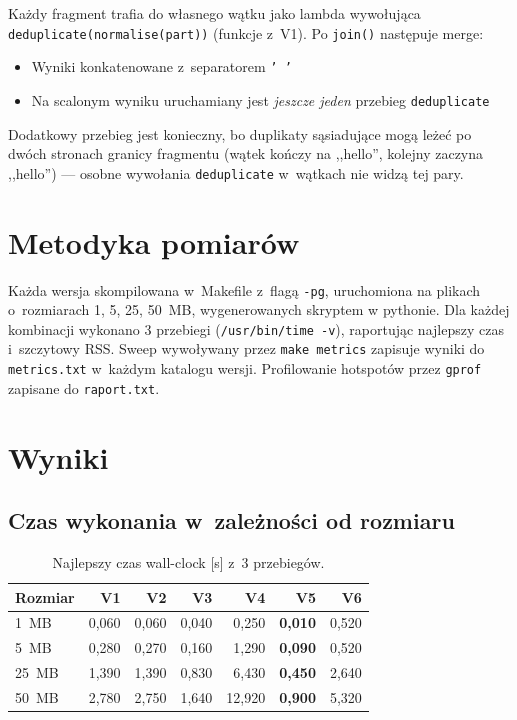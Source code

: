 \documentclass[11pt,a4paper]{article}
\begin{document}
Każdy fragment trafia do własnego wątku jako lambda wywołująca \texttt{deduplicate(normalise(part))} (funkcje z~V1). Po \texttt{join()} następuje merge:
\begin{itemize}
    \item Wyniki konkatenowane z~separatorem \texttt{' '}
    \item Na scalonym wyniku uruchamiany jest \emph{jeszcze jeden} przebieg \texttt{deduplicate}
\end{itemize}
Dodatkowy przebieg jest konieczny, bo duplikaty sąsiadujące mogą leżeć po dwóch stronach granicy fragmentu (wątek kończy na ,,hello'', kolejny zaczyna ,,hello'') --- osobne wywołania \texttt{deduplicate} w~wątkach nie widzą tej pary.

\section{Metodyka pomiarów}
Każda wersja skompilowana w~Makefile z~flagą \texttt{-pg}, uruchomiona na plikach o~rozmiarach 1, 5, 25, 50~MB, wygenerowanych skryptem w pythonie.
Dla każdej kombinacji wykonano 3 przebiegi (\texttt{/usr/bin/time -v}), raportując najlepszy czas i~szczytowy RSS. Sweep wywoływany przez \texttt{make metrics} zapisuje wyniki do \texttt{metrics.txt} w~każdym katalogu wersji. Profilowanie hotspotów przez \texttt{gprof} zapisane do \texttt{raport.txt}.

\section{Wyniki}

\subsection{Czas wykonania w~zależności od rozmiaru}

\begin{table}[H]\centering
\begin{tabular}{lrrrrrr}
\toprule
Rozmiar & V1 & V2 & V3 & V4 & V5 & V6 \\
\midrule
1~MB  & 0{,}060 & 0{,}060 & 0{,}040 & 0{,}250 & \textbf{0{,}010} & 0{,}520 \\
5~MB  & 0{,}280 & 0{,}270 & 0{,}160 & 1{,}290 & \textbf{0{,}090} & 0{,}520 \\
25~MB & 1{,}390 & 1{,}390 & 0{,}830 & 6{,}430 & \textbf{0{,}450} & 2{,}640 \\
50~MB & 2{,}780 & 2{,}750 & 1{,}640 & 12{,}920 & \textbf{0{,}900} & 5{,}320 \\
\bottomrule
\end{tabular}
\caption{Najlepszy czas wall-clock [s] z~3 przebiegów.}
\end{table}
\end{document}
